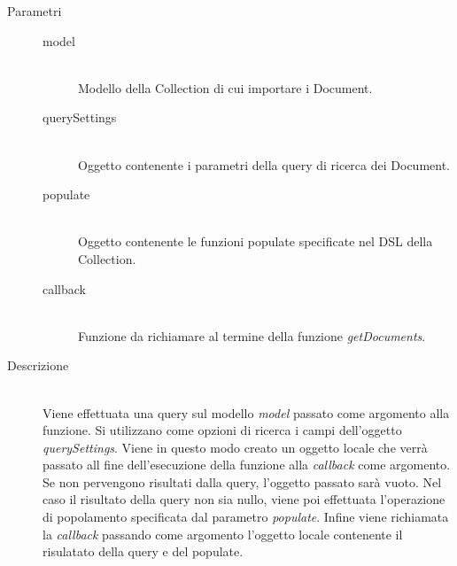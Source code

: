 \begin{description}
\begin{mldescription}
	 \hfill
		\begin{description}
			\item[Parametri] \hfill
			\begin{description}
				\item[model] \hfill \\
				Modello della Collection di cui importare i Document.
				\item[querySettings] \hfill \\
				Oggetto contenente i parametri della query di ricerca dei Document.
				\item[populate] \hfill \\
				Oggetto contenente le funzioni populate specificate nel DSL della Collection.
				\item[callback] \hfill \\
				Funzione da richiamare al termine della funzione \textit{getDocuments}.
			\end{description}
			\item[Descrizione] \hfill \\
			Viene effettuata una query sul modello \textit{model} passato come argomento alla funzione. Si utilizzano come opzioni di ricerca i campi dell'oggetto \textit{querySettings}. Viene in questo modo creato un oggetto locale che verrà passato all fine dell'esecuzione della funzione alla \textit{callback} come argomento. Se non pervengono risultati dalla query, l'oggetto passato sarà vuoto. Nel caso il risultato della query non sia nullo, viene poi effettuata l'operazione di popolamento specificata dal parametro \textit{populate}. Infine viene richiamata la \textit{callback} passando come argomento l'oggetto locale contenente il risulatato della query e del populate.
		\end{description}			
	 

\end{mldescription}
\end{description}
